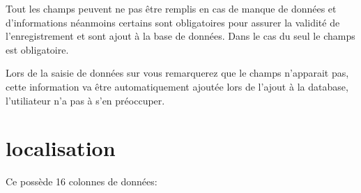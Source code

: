 \documentclass[letterpaper,10pt,french]{sphinxmanual}
\begin{document}
\sphinxAtStartPar
Tout les champs peuvent ne pas être remplis en cas de manque de données et d’informations néanmoins certains sont obligatoires
pour assurer la validité de l’enregistrement et sont ajout à la base de données. Dans le cas du    seul le champs  est obligatoire.

\sphinxAtStartPar
Lors de la saisie de données sur  vous remarquerez que le champs  n’apparait pas, cette information va être automatiquement ajoutée lors de l’ajout à la database, l’utiliateur n’a pas à s’en
préoccuper.


\section{localisation}
\label{\detokenize{bones:localisation}}
\sphinxAtStartPar
Ce  possède 16 colonnes de données:
\end{document}
